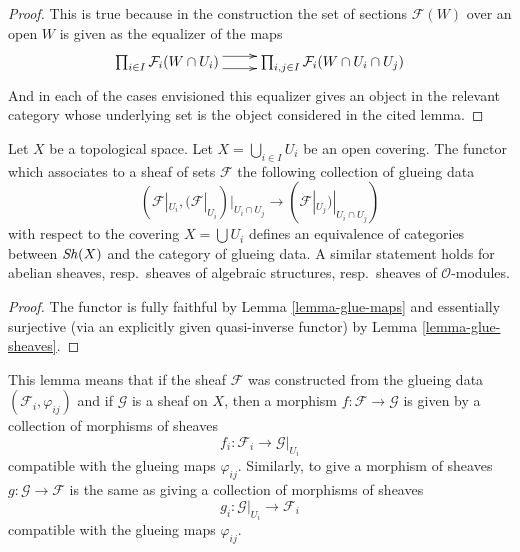 \begin{proof}
This is true because in the construction the set of sections
$\mathcal{F}(W)$ over an open $W$ is given as the
equalizer of the maps
$$
\xymatrix{
\prod_{i \in I} \mathcal{F}_i(W \cap U_i)
\ar@<1ex>[r]
\ar@<-1ex>[r]
&
\prod_{i, j\in I} \mathcal{F}_i(W \cap U_i \cap U_j)
}
$$
And in each of the cases envisioned this equalizer gives
an object in the relevant category whose underlying set is
the object considered in the cited lemma.
\end{proof}

\begin{lemma}
\label{lemma-mapping-property-glue}
Let $X$ be a topological space.
Let $X = \bigcup_{i\in I} U_i$ be an open covering.
The functor which associates to a sheaf of
sets $\mathcal{F}$ the following collection of
glueing data
$$
(\mathcal{F}|_{U_i},
(\mathcal{F}|_{U_i})|_{U_i \cap U_j}
\to
(\mathcal{F}|_{U_j})|_{U_i \cap U_j}
)
$$
with respect to the covering $X = \bigcup U_i$
defines an equivalence of categories between
$\mathop{\mathit{Sh}}\nolimits(X)$ and the category of glueing
data. A similar statement holds for
abelian sheaves, resp.\ sheaves of algebraic structures,
resp.\ sheaves of $\mathcal{O}$-modules.
\end{lemma}

\begin{proof}
The functor is fully faithful by
Lemma \ref{lemma-glue-maps}
and essentially surjective (via an explicitly given quasi-inverse functor) by
Lemma \ref{lemma-glue-sheaves}.
\end{proof}

\noindent
This lemma means that if the sheaf $\mathcal{F}$ was constructed
from the glueing data $(\mathcal{F}_i, \varphi_{ij})$
and if $\mathcal{G}$ is a sheaf on $X$, then a morphism
$f : \mathcal{F} \to \mathcal{G}$ is given by a collection of
morphisms of sheaves
$$
f_i : \mathcal{F}_i \longrightarrow \mathcal{G}|_{U_i}
$$
compatible with the glueing maps $\varphi_{ij}$. Similarly,
to give a morphism of sheaves $g : \mathcal{G} \to \mathcal{F}$
is the same as giving a collection of morphisms of sheaves
$$
g_i : \mathcal{G}|_{U_i} \longrightarrow \mathcal{F}_i
$$
compatible with the glueing maps $\varphi_{ij}$.










